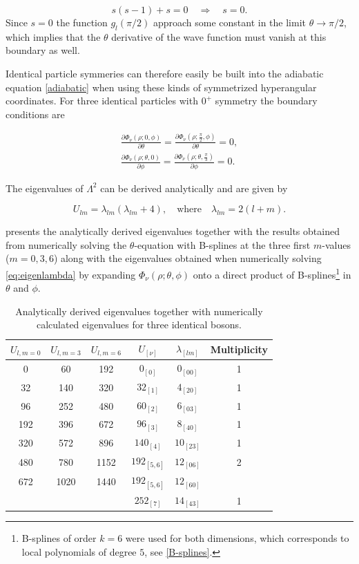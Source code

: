 \begin{equation}
s(s-1)+s = 0 \quad \Rightarrow \quad s=0.
\end{equation}
Since $s=0$ the function $g_l(\pi/2)$ approach some constant in the limit $\theta \rightarrow \pi/2$, which implies that the $\theta$ derivative of the wave function must vanish at this boundary as well.

Identical particle symmeries can therefore easily be built into the adiabatic equation \eqref{adiabatic} when using these kinds of symmetrized hyperangular coordinates. For three identical particles with $0^+$ symmetry the boundary conditions are  

\begin{align}
\frac{\partial\Phi_{\nu}(\rho;0,\phi)}{\partial \theta} = \frac{\partial\Phi_{\nu}(\rho;\frac{\pi}{2},\phi)}{\partial \theta} = 0,\\
\frac{\partial\Phi_{\nu}(\rho;\theta,0)}{\partial \phi} = \frac{\partial\Phi_{\nu}(\rho;\theta,\frac{\pi}{3})}{\partial \phi} = 0.
\end{align}

The eigenvalues of  $\Lambda^2$ can be derived analytically and are given by

\begin{equation}
U_{lm} = \lambda_{lm}(\lambda_{lm} + 4), \quad \text{where} \quad \lambda_{lm}=2(l+m).
\end{equation}

 presents the analytically derived eigenvalues together with the results obtained from numerically solving the $\theta$-equation with B-splines at the three first $m$-values ($m=0,3,6$) along with the eigenvalues obtained when numerically solving \eqref{eq:eigenlambda} by expanding $\Phi_{\nu}(\rho;\theta,\phi)$ onto a direct product of B-splines\footnote{B-splines of order $k=6$ were used for both dimensions, which corresponds to local polynomials of degree $5$, see \cref{B-splines}.} in $\theta$ and $\phi$. 

\begin{table}[h!]
	\centering
	\begin{tabular}{||c c c | c c c||} 
		\hline
		$U_{l,m=0}$ & $U_{l,m=3}$ & $U_{l,m=6}$ & $U_{[\nu]}$ & $\lambda_{[lm]}$& Multiplicity \\ [0.5ex] 
		\hline\hline
		0		& 60     & 192 & $0_{[0]}$ & $0_{[00]}$ & 1  \\ 
		32 & 140   & 320 & $32_{[1]}$ & $4_{[20]}$ & 1  \\
		96  & 252  & 480 & $60_{[2]}$& $6_{[03]}$ & 1  \\
		192& 396  & 672  & $96_{[3]}$ & $8_{[40]}$ & 1  \\
		320 & 572  & 896  & $140_{[4]}$&$10_{[23]}$ & 1  \\
		480  & 780  & 1152 & $192_{[5,6]}$ & $12_{[06]}$ & 2  \\  
		672  & 1020  & 1440 & $192_{[5,6]}$ & $12_{[60]}$ &  \\  
		   &  &  & $252_{[7]}$ & $14_{[43]}$ & 1  \\ [1ex] 
		\hline
	\end{tabular}
	\caption{Analytically derived eigenvalues together with numerically calculated eigenvalues for three identical bosons.}
	\label{table:1}
\end{table} 
